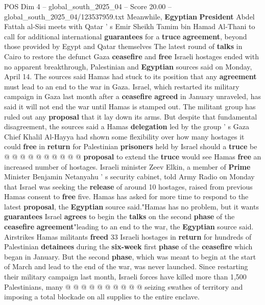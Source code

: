 \begin{textsample}{POS Dim 4 – global\_south\_2025\_04 – Score 20.00 – global\_south\_2025\_04/123537959.txt}  \label{ex:f4_pos_246}
Meanwhile, \textbf{Egyptian} \textbf{President} Abdel Fattah al-Sisi meets with Qatar ' s Emir Sheikh Tamim bin Hamad Al-Thani to call for additional international \textbf{guarantees} for a \textbf{truce} \textbf{agreement}, beyond those provided by Egypt and Qatar themselves The latest round of \textbf{talks} in Cairo to restore the defunct Gaza \textbf{ceasefire} and \textbf{free} Israeli hostages ended with no apparent breakthrough, Palestinian and \textbf{Egyptian} sources said on Monday, April 14.
The sources said Hamas had stuck to its position that any \textbf{agreement} must lead to an end to the war in Gaza.
Israel, which restarted its military campaign in Gaza last month after a \textbf{ceasefire} \textbf{agreed} in January unraveled, has said it will not end the war until Hamas is stamped out.
The militant group has ruled out any \textbf{proposal} that it lay down its arms.
But despite that fundamental disagreement, the sources said a Hamas \textbf{delegation} led by the group ' s Gaza Chief Khalil Al-Hayya had shown some flexibility over how many hostages it could \textbf{free} in \textbf{return} for Palestinian \textbf{prisoners} held by Israel should a \textbf{truce} be @ @ @ @ @ @ @ @ @ @ \textbf{proposal} to extend the \textbf{truce} would see Hamas \textbf{free} an increased number of hostages.
Israeli minister Zeev Elkin, a member of \textbf{Prime} Minister Benjamin Netanyahu ' s security cabinet, told Army Radio on Monday that Israel was seeking the \textbf{release} of around 10 hostages, raised from previous Hamas consent to \textbf{free} five.
Hamas has asked for more time to respond to the latest \textbf{proposal}, the \textbf{Egyptian} source said."Hamas has no problem, but it wants \textbf{guarantees} Israel \textbf{agrees} to begin the \textbf{talks} on the second \textbf{phase} of the \textbf{ceasefire} \textbf{agreement}"leading to an end to the war, the \textbf{Egyptian} source said.
Airstrikes Hamas militants \textbf{freed} 33 Israeli hostages in \textbf{return} for hundreds of Palestinian \textbf{detainees} during the \textbf{six-week} first \textbf{phase} of the \textbf{ceasefire} which began in January.
But the second \textbf{phase}, which was meant to begin at the start of March and lead to the end of the war, was never launched.
Since restarting their military campaign last month, Israeli forces have killed more than 1,500 Palestinians, many @ @ @ @ @ @ @ @ @ @ seizing swathes of territory and imposing a total blockade on all supplies to the entire enclave.

\end{textsample}
